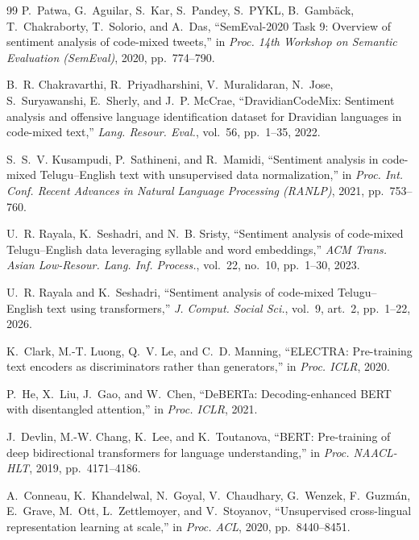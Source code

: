 \documentclass[10pt,conference]{IEEEtran}
\begin{document}
\begin{thebibliography}{99}
\footnotesize
\setlength{\itemsep}{1pt}
\setlength{\parskip}{0pt}
P.~Patwa, G.~Aguilar, S.~Kar, S.~Pandey, S.~PYKL, B.~Gamb\"ack, T.~Chakraborty, T.~Solorio, and A.~Das, ``SemEval-2020 Task 9: Overview of sentiment analysis of code-mixed tweets,'' in \emph{Proc. 14th Workshop on Semantic Evaluation (SemEval)}, 2020, pp.~774--790.

B.~R. Chakravarthi, R.~Priyadharshini, V.~Muralidaran, N.~Jose, S.~Suryawanshi, E.~Sherly, and J.~P. McCrae, ``DravidianCodeMix: Sentiment analysis and offensive language identification dataset for Dravidian languages in code-mixed text,'' \emph{Lang. Resour. Eval.}, vol.~56, pp.~1--35, 2022.

S.~S.~V. Kusampudi, P.~Sathineni, and R.~Mamidi, ``Sentiment analysis in code-mixed Telugu--English text with unsupervised data normalization,'' in \emph{Proc. Int. Conf. Recent Advances in Natural Language Processing (RANLP)}, 2021, pp.~753--760.

U.~R. Rayala, K.~Seshadri, and N.~B. Sristy, ``Sentiment analysis of code-mixed Telugu--English data leveraging syllable and word embeddings,'' \emph{ACM Trans. Asian Low-Resour. Lang. Inf. Process.}, vol.~22, no.~10, pp.~1--30, 2023.

U.~R. Rayala and K.~Seshadri, ``Sentiment analysis of code-mixed Telugu--English text using transformers,'' \emph{J. Comput. Social Sci.}, vol.~9, art.~2, pp.~1--22, 2026.

K.~Clark, M.-T. Luong, Q.~V. Le, and C.~D. Manning, ``ELECTRA: Pre-training text encoders as discriminators rather than generators,'' in \emph{Proc. ICLR}, 2020.

P.~He, X.~Liu, J.~Gao, and W.~Chen, ``DeBERTa: Decoding-enhanced BERT with disentangled attention,'' in \emph{Proc. ICLR}, 2021.

J.~Devlin, M.-W. Chang, K.~Lee, and K.~Toutanova, ``BERT: Pre-training of deep bidirectional transformers for language understanding,'' in \emph{Proc. NAACL-HLT}, 2019, pp.~4171--4186.

A.~Conneau, K.~Khandelwal, N.~Goyal, V.~Chaudhary, G.~Wenzek, F.~Guzm\'an, E.~Grave, M.~Ott, L.~Zettlemoyer, and V.~Stoyanov, ``Unsupervised cross-lingual representation learning at scale,'' in \emph{Proc. ACL}, 2020, pp.~8440--8451.


\end{thebibliography}
\end{document}
